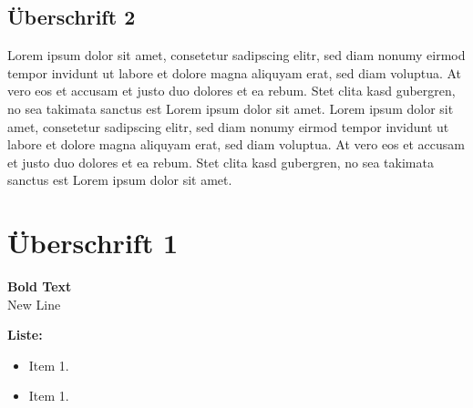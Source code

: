 \documentclass{article}
\begin{document}
\subsection{Überschrift 2}
Lorem ipsum dolor sit amet, consetetur sadipscing elitr, sed diam nonumy eirmod tempor invidunt ut labore et dolore magna aliquyam erat, sed diam voluptua. At vero eos et accusam et justo duo dolores et ea rebum. Stet clita kasd gubergren, no sea takimata sanctus est Lorem ipsum dolor sit amet. Lorem ipsum dolor sit amet, consetetur sadipscing elitr, sed diam nonumy eirmod tempor invidunt ut labore et dolore magna aliquyam erat, sed diam voluptua. At vero eos et accusam et justo duo dolores et ea rebum. Stet clita kasd gubergren, no sea takimata sanctus est Lorem ipsum dolor sit amet.

\section{Überschrift 1}
\textbf{Bold Text} \\
New Line


\textbf{Liste:}
\begin{itemize}
	\item Item 1. 
	\item Item 1. 
\end{itemize}
\end{document}
